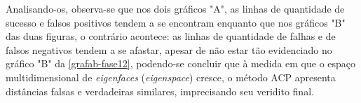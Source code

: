 Analisando-os, observa-se que nos dois gráficos "A", as linhas de quantidade de sucesso e falsos positivos tendem a se encontram enquanto que nos gráficos "B" das duas figuras, o contrário acontece: as linhas de quantidade de falhas e de falsos negativos tendem a se afastar, apesar de não estar tão evidenciado no gráfico "B" da \autoref{grafab-fase12}, podendo-se concluir que à medida em que o espaço multidimensional de \textit{eigenfaces} (\textit{eigenspace}) cresce, o método ACP apresenta distâncias falsas e verdadeiras similares, imprecisando seu veridito final.
























